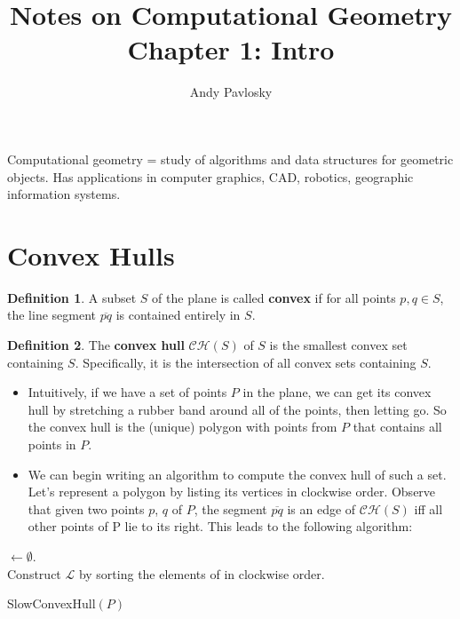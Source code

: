 \documentclass{article}
\title{Notes on Computational Geometry\\Chapter 1: Intro}
\author{Andy Pavlosky}
\date{}
\theoremstyle{definition}
\newtheorem{defn}{Definition}
\theoremstyle{plain}
\begin{document}
\maketitle

Computational geometry = study of algorithms and data structures for geometric objects.
Has applications in computer graphics, CAD, robotics, geographic information systems.

\section{Convex Hulls}

\begin{defn}
    A subset $S$ of the plane is called \textbf{convex} if for all points $p, q \in S$,
    the line segment $\overline{pq}$ is contained entirely in $S$.
\end{defn}

\begin{defn}
    The \textbf{convex hull} $\mathcal{CH}(S)$ of $S$ is the smallest convex set containing $S$.
    Specifically, it is the intersection of all convex sets containing $S$.
\end{defn}

\begin{itemize}
    \item Intuitively, if we have a set of points $P$ in the plane, we can get its convex hull by
    stretching a rubber band around all of the points, then letting go. So the 
    convex hull is the (unique) polygon with points from $P$ that contains all points in $P$.
    \item We can begin writing an algorithm to compute the convex hull of such a set. Let's represent a polygon by
    listing its vertices in clockwise order. Observe that given two points $p$, $q$ of $P$, the segment
    $\overline{pq}$ is an edge of $\mathcal{CH}(S)$ iff all other points of P lie to its right.
    This leads to the following algorithm:
\end{itemize}

\begin{algorithm}

    \BlankLine
    \Edges$\gets \emptyset$.\\
    Construct $\mathcal{L}$ by sorting the elements of \Edges in clockwise order.\\

    \caption{SlowConvexHull$(P)$}
\end{algorithm}
\end{document}
